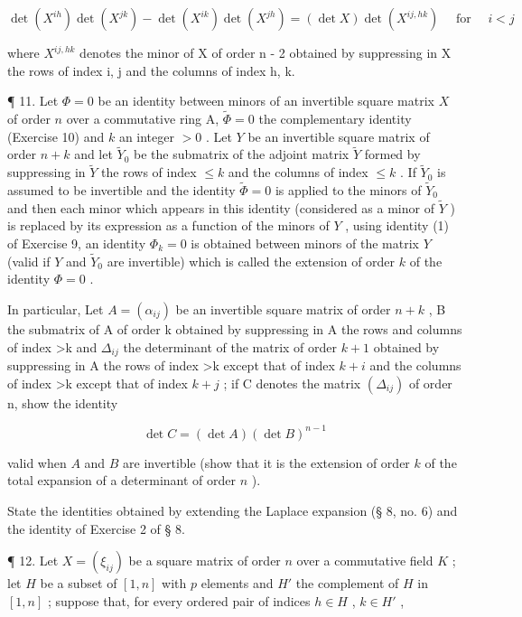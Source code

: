 \[
\det (X ^ {i h}) \det (X ^ {j k}) - \det (X ^ {i k}) \det (X ^ {j h}) = (\det X) \det (X ^ {i j, h k}) \quad \text { for } \quad i <   j
\]

where \(X^{ij, hk}\) denotes the minor of X of order n - 2 obtained by suppressing in X the rows of index i, j and the columns of index h, k.

¶ 11. Let \(\Phi = 0\) be an identity between minors of an invertible square matrix \(X\) of order \(n\) over a commutative ring A, \(\tilde{\Phi} = 0\) the complementary identity (Exercise 10) and \(k\) an integer \(>0\) . Let \(Y\) be an invertible square matrix of order \(n + k\) and let \(\tilde{Y}_0\) be the submatrix of the adjoint matrix \(\tilde{Y}\) formed by suppressing in \(\tilde{Y}\) the rows of index \(\leqslant k\) and the columns of index \(\leqslant k\) . If \(\tilde{Y}_0\) is assumed to be invertible and the identity \(\tilde{\Phi} = 0\) is applied to the minors of \(\tilde{Y}_0\) and then each minor which appears in this identity (considered as a minor of \(\tilde{Y}\) ) is replaced by its expression as a function of the minors of \(Y\) , using identity (1) of Exercise 9, an identity \(\Phi_k = 0\) is obtained between minors of the matrix \(Y\) (valid if \(Y\) and \(\tilde{Y}_0\) are invertible) which is called the extension of order \(k\) of the identity \(\Phi = 0\) .

In particular, Let \(A = (\alpha_{ij})\) be an invertible square matrix of order \(n + k\) , B the submatrix of A of order k obtained by suppressing in A the rows and columns of index \textgreater k and \(\Delta_{ij}\) the determinant of the matrix of order \(k + 1\) obtained by suppressing in A the rows of index \textgreater k except that of index \(k + i\) and the columns of index \textgreater k except that of index \(k + j\) ; if C denotes the matrix \((\Delta_{ij})\) of order n, show the identity

\[
\det C = (\det A) (\det B) ^ {n - 1}
\]

valid when \(A\) and \(B\) are invertible (show that it is the extension of order \(k\) of the total expansion of a determinant of order \(n\) ).

State the identities obtained by extending the Laplace expansion (§ 8, no. 6) and the identity of Exercise 2 of § 8.

¶ 12. Let \(X = (\xi_{ij})\) be a square matrix of order \(n\) over a commutative field \(K\) ; let \(H\) be a subset of \([1, n]\) with \(p\) elements and \(H'\) the complement of \(H\) in \([1, n]\) ; suppose that, for every ordered pair of indices \(h \in H\) , \(k \in H'\) ,

